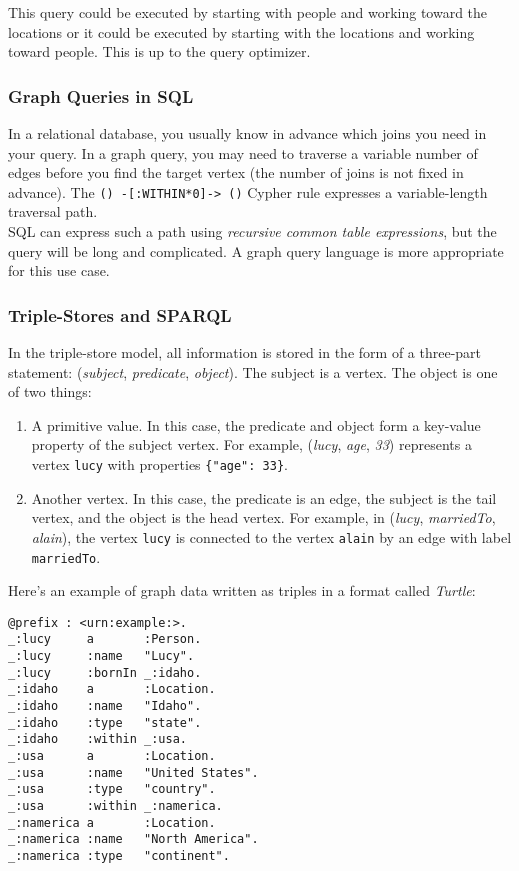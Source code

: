 \documentclass[12pt, titlepage]{article}
\begin{document}
This query could be executed by starting with people and working toward the locations or it could be executed by starting with the locations and working toward people. This is up to the query optimizer.

\subsubsection{Graph Queries in SQL}

In a relational database, you usually know in advance which joins you need in your query. In a graph query, you may need to traverse a variable number of edges before you find the target vertex (the number of joins is not fixed in advance). The \texttt{() -[:WITHIN*0]-> ()} Cypher rule expresses a variable-length traversal path. \\

SQL can express such a path using \textit{recursive common table expressions}, but the query will be long and complicated. A graph query language is more appropriate for this use case.

\subsubsection{Triple-Stores and SPARQL}

In the triple-store model, all information is stored in the form of a three-part statement: (\textit{subject}, \textit{predicate}, \textit{object}). The subject is a vertex. The object is one of two things:

\begin{enumerate}
    \item A primitive value. In this case, the predicate and object form a key-value property of the subject vertex. For example, (\textit{lucy}, \textit{age}, \textit{33}) represents a vertex \texttt{lucy} with properties \texttt{\{"age": 33\}}.
    \item Another vertex. In this case, the predicate is an edge, the subject is the tail vertex, and the object is the head vertex. For example, in (\textit{lucy}, \textit{marriedTo}, \textit{alain}), the vertex \texttt{lucy} is connected to the vertex \texttt{alain} by an edge with label \texttt{marriedTo}.
\end{enumerate}

Here's an example of graph data written as triples in a format called \textit{Turtle}:

\begin{verbatim}
@prefix : <urn:example:>.
_:lucy     a       :Person.
_:lucy     :name   "Lucy".
_:lucy     :bornIn _:idaho.
_:idaho    a       :Location.
_:idaho    :name   "Idaho".
_:idaho    :type   "state".
_:idaho    :within _:usa.
_:usa      a       :Location.
_:usa      :name   "United States".
_:usa      :type   "country".
_:usa      :within _:namerica.
_:namerica a       :Location.
_:namerica :name   "North America".
_:namerica :type   "continent".
\end{verbatim}
\end{document}
